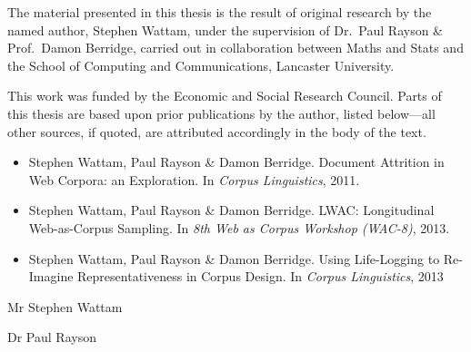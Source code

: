 The material presented in this thesis is the result of original research by the named author, Stephen Wattam, under the supervision of Dr.\ Paul Rayson \& Prof.\ Damon Berridge, carried out in collaboration between Maths and Stats and the School of Computing and Communications, Lancaster University.

This work was funded by the Economic and Social Research Council.  Parts of this thesis are based upon prior publications by the author, listed below---all other sources, if quoted, are attributed accordingly in the body of the text.

\begin{itemize}
    \item Stephen Wattam, Paul Rayson \& Damon Berridge.  Document Attrition in Web Corpora: an Exploration.  In \textsl{Corpus Linguistics}, 2011.
    \item Stephen Wattam, Paul Rayson \& Damon Berridge.  LWAC: Longitudinal Web-as-Corpus Sampling.  In \textsl{8th Web as Corpus Workshop (WAC-8)}, 2013.
    \item Stephen Wattam, Paul Rayson \& Damon Berridge.  Using Life-Logging to Re-Imagine Representativeness in Corpus Design.  In \textsl{Corpus Linguistics}, 2013
\end{itemize}

\vspace{1in}
Mr Stephen Wattam \dotfill


\vspace{0.5in}
Dr Paul Rayson \dotfill






